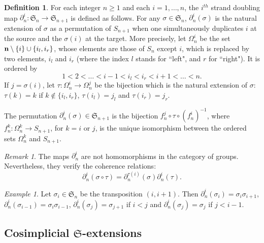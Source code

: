 \documentclass[twoside]{irmaems}
\theoremstyle{plain}
\theoremstyle{definition}
\newtheorem{definition}{Definition}[section]
\theoremstyle{remark}
\newtheorem{remark}[theorem]{Remark}
\newtheorem{example}{Example}[section]
\newcommand{\s}{{\sigma}}
\def\pa{{\partial}}
\begin{document}
\begin{definition}
For each integer $n\geq 1$ and each $i=1,\ldots,n$, the $i^{th}$ strand doubling map $\partial^{i}_{n}:\mathfrak{S}_{n}\rightarrow \mathfrak{S}_{n+1}$ is defined as follows. For any $\sigma\in \mathfrak{S}_{n}$, $\partial^{i}_{n}(\sigma)$ is the natural extension of $\sigma$ as a permutation
of $S_{n+1}$ when one  simultaneously duplicates $i$ at the source and the $\sigma(i)$ at the target. More precisely, let $\Omega^{i}_n$ be the set ${\bf n}\setminus\{i\}\cup \{i_l,i_r\}$, whose elements are those of
$S_{n}$ except $i$, which is replaced by two elements, $i_{l}$ and $i_{r}$ (where the index $l$ stands for ``left", and $r$ for ``right"). It is ordered by\\
$$1<2<\ldots<i-1<i_l<i_r<i+1<\ldots<n.$$ 
If $j=\sigma(i)$, let $\tau:\Omega^{i}_n\rightarrow \Omega^{j}_n$ be the bijection which is the natural extension of $\sigma$:
$\tau(k)=k$ if $k\notin \{i_{l}, i_{r}\}$, $\tau(i_{l})=j_{l}$ and $\tau(i_{r})=j_{r}$.

\vspace{0.1cm}\noindent 
The permutation  $\partial^{i}_{n}(\sigma)\in \mathfrak{S}_{n+1}$ is the bijection $f^j_n\circ \tau\circ {(f^{i}_n)}^{-1}$, where $f^{k}_n:\Omega_{n}^k\rightarrow S_{n+1}$, for $k=i$ or $j$, is the unique
isomorphism between the ordered sets $\Omega^{k}_n$ and $ S_{n+1}$.\\
\end{definition}

\begin{remark} The maps $\pa^{i}_{n}$ are not homomorphisms in the category of groups. Nevertheless, they verify the coherence relations:
$$\pa^{i}_{n}(\s\circ \tau)=\pa^{\tau(i)}_{n}(\s)\pa^{i}_{n}(\tau).$$
\end{remark}


\begin{example} Let $\s_{i}\in \mathfrak{S}_{n}$ be the transposition $(i, i+1)$. Then $\partial^{i}_{n}(\s_{i})=\s_{i} \s_{i+1}$, 
$\partial^{i}_{n}(\s_{i-1})=\s_{i} \s_{i-1}$, $\partial^{i}_{n}(\s_{j})=\s_{j+1}$ if $i<j$ and
 $\partial^{i}_{n}(\s_{j})=\s_{j}$ if $j<i-1$.
 \end{example}
 
 \subsection{Cosimplicial $\mathfrak{S}$-extensions}
 
\end{document}
